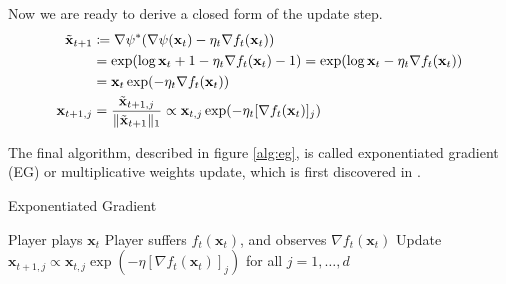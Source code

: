 \documentclass[12pt, a4paper]{report}
\begin{document}
Now we are ready to derive a closed form of the update step.
\begin{align*}
    \Tilde{\mathbf{x}}_{t+1} &\coloneqq \nabla \psi^*(\nabla \psi(\mathbf{x}_t) - \eta_t\nabla f_t(\mathbf{x}_t))
    \\
    &= \exp( \log \mathbf{x}_t + 1 - \eta_t \nabla f_t(\mathbf{x}_t) - 1) = \exp(\log \mathbf{x}_t - \eta_t \nabla f_t(\mathbf{x}_t))
    \\
    &= \mathbf{x}_t \exp(-\eta_t \nabla f_t(\mathbf{x}_t))
    \\
    \mathbf{x}_{t+1, j} &= \frac{\Tilde{\mathbf{x}}_{t+1, j}}{\lVert \Tilde{\mathbf{x}}_{t+1} \rVert_1} \propto \mathbf{x}_{t, j} \exp(-\eta_t [\nabla f_t(\mathbf{x}_t)]_j)
\end{align*}

The final algorithm, described in figure \ref{alg:eg}, is called exponentiated gradient (EG) or multiplicative weights update, which is first discovered in \cite{Kivinen1997ExponentiatedGV}.
    
\begin{algorithm}
\caption{Exponentiated Gradient} \label{alg:eg}
\begin{algorithmic}
\State Player plays $\mathbf{x}_t$
\State Player suffers $f_t(\mathbf{x}_t)$, and observes $\nabla f_t(\mathbf{x}_t)$
\State Update $\mathbf{x}_{t+1, j} \propto \mathbf{x}_{t, j}\exp(-\eta [\nabla f_t(\mathbf{x}_t)]_j)$ for all $j = 1, \dots, d$
\EndFor
\end{algorithmic}
\end{algorithm}
\end{document}
